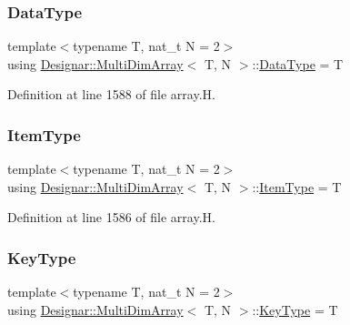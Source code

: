 \subsubsection{\texorpdfstring{Data\+Type}{DataType}}
{\footnotesize\ttfamily template$<$typename T, nat\+\_\+t N = 2$>$ \\
using \hyperlink{class_designar_1_1_multi_dim_array}{Designar\+::\+Multi\+Dim\+Array}$<$ T, N $>$\+::\hyperlink{class_designar_1_1_multi_dim_array_a23b3bec3a6a803d8ef7becceb592d6c0}{Data\+Type} =  T}



Definition at line 1588 of file array.\+H.

\mbox{\label{class_designar_1_1_multi_dim_array_a1b4c346c7e11cbada54447843d0c7880}} 
\subsubsection{\texorpdfstring{Item\+Type}{ItemType}}
{\footnotesize\ttfamily template$<$typename T, nat\+\_\+t N = 2$>$ \\
using \hyperlink{class_designar_1_1_multi_dim_array}{Designar\+::\+Multi\+Dim\+Array}$<$ T, N $>$\+::\hyperlink{class_designar_1_1_multi_dim_array_a1b4c346c7e11cbada54447843d0c7880}{Item\+Type} =  T}



Definition at line 1586 of file array.\+H.

\mbox{\label{class_designar_1_1_multi_dim_array_aa8c6b455e3cd5b74a57243a13553c6ff}} 
\subsubsection{\texorpdfstring{Key\+Type}{KeyType}}
{\footnotesize\ttfamily template$<$typename T, nat\+\_\+t N = 2$>$ \\
using \hyperlink{class_designar_1_1_multi_dim_array}{Designar\+::\+Multi\+Dim\+Array}$<$ T, N $>$\+::\hyperlink{class_designar_1_1_multi_dim_array_aa8c6b455e3cd5b74a57243a13553c6ff}{Key\+Type} =  T}



